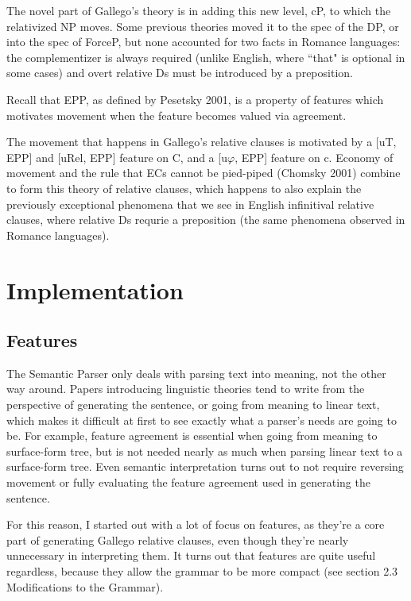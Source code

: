 \documentclass[11pt]{article}
\begin{document}
The novel part of Gallego's theory is in adding this new level, cP, to which the relativized NP moves.
Some previous theories moved it to the spec of the DP, or into the spec of ForceP, but none accounted
for two facts in Romance languages: the complementizer is always required (unlike English, where ``that"
is optional in some cases) and overt relative Ds must be introduced by a preposition.

Recall that EPP, as defined by Pesetsky 2001, is a property of features which motivates movement
when the feature becomes valued via agreement.

The movement that happens in Gallego's relative clauses is motivated by a [uT, EPP] and [uRel, EPP]
feature on C, and a [u$\varphi$, EPP] feature on c. Economy of movement and the rule that ECs cannot
be pied-piped (Chomsky 2001)
combine to form this theory of relative clauses, which happens to also explain the previously exceptional
phenomena that we see in English infinitival relative clauses, where relative Ds requrie a preposition
(the same phenomena observed in Romance languages).

\section{Implementation}

\subsection{Features}
The Semantic Parser only deals with parsing text into meaning, not the other way around. Papers
introducing linguistic theories tend to write from the perspective of generating the sentence, or
going from meaning to linear text, which makes it difficult at first to see exactly what a parser's
needs are going to be. For example, feature agreement is essential when going from meaning to surface-form
tree, but is not needed nearly as much when parsing linear text to a surface-form tree. Even
semantic interpretation turns out to not require reversing movement or fully evaluating the feature
agreement used in generating the sentence.

For this reason, I started out with a lot of focus on features, as they're a core part of generating
Gallego relative clauses, even though they're nearly unnecessary in interpreting them. It turns out
that features are quite useful regardless, because they allow the grammar to be more compact (see
section 2.3 Modifications to the Grammar).
\end{document}
